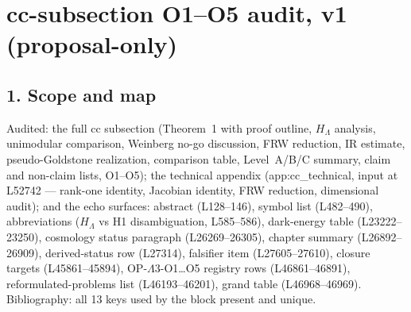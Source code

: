 \section*{cc-subsection O1--O5 audit, v1 (proposal-only)}

\subsection*{1. Scope and map}
Audited: the full cc subsection (Theorem~1 with proof outline,
$H_\Lambda$ analysis, unimodular comparison, Weinberg no-go
discussion, FRW reduction, IR estimate, pseudo-Goldstone
realization, comparison table, Level~A/B/C summary, claim and
non-claim lists, O1--O5); the technical appendix
(app:cc\_technical, input at L52742 --- rank-one identity,
Jacobian identity, FRW reduction, dimensional audit); and the
echo surfaces: abstract (L128--146), symbol list (L482--490),
abbreviations ($H_\Lambda$ vs H1 disambiguation, L585--586),
dark-energy table (L23222--23250), cosmology status paragraph
(L26269--26305), chapter summary (L26892--26909), derived-status
row (L27314), falsifier item (L27605--27610), closure targets
(L45861--45894), OP-$\Lambda$3-O1\ldots O5 registry rows
(L46861--46891), reformulated-problems list (L46193--46201),
grand table (L46968--46969). Bibliography: all 13 keys used by
the block present and unique.

